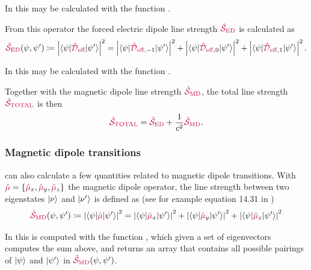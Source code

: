 \documentclass[11pt, twoside,openright]{article}
\begin{document}
In \qlanth this may be calculated with the function .

From this operator the forced electric dipole line strength $\textcolor{purple}{\hat{\mathcal{S}}_\text{ED}}$ is calculated as
\begin{equation} \label{eqn:forced-ED-line-strength}
	\textcolor{purple}{\hat{\mathcal{S}}_\text{ED}}(\psi,\psi') \coloneqq \left| \langle \psi|\textcolor{purple}{{\textcolor{purple}{\hat{\mathcal{D}}}_\text{eff}}}|\psi'\rangle \right|^2 = \left| \langle \psi|\textcolor{purple}{{\textcolor{purple}{\hat{\mathcal{D}}}_\text{eff}}}_{,-1}|\psi'\rangle \right|^2 + \left| \langle \psi|\textcolor{purple}{{\textcolor{purple}{\hat{\mathcal{D}}}_\text{eff}}}_{,0}|\psi'\rangle \right|^2 + \left| \langle \psi|\textcolor{purple}{{\textcolor{purple}{\hat{\mathcal{D}}}_\text{eff}}}_{,1}|\psi'\rangle \right|^2.
\end{equation}

In \qlanth this may be calculated with the function .

Together with the magnetic dipole line strength $\textcolor{purple}{\hat{\mathcal{S}}_\text{MD}}$, the total line strength $\textcolor{purple}{\hat{\mathcal{S}}_\text{TOTAL}}$ is then 
\begin{equation} \label{eqn:total-line-strength}
	\textcolor{purple}{\hat{\mathcal{S}}_\text{TOTAL}} = \textcolor{purple}{\hat{\mathcal{S}}_\text{ED}} + \frac{1}{c^2} \textcolor{purple}{\hat{\mathcal{S}}_\text{MD}}.
\end{equation}

 

 

\subsubsection{Magnetic dipole transitions}

\qlanth can also calculate a few quantities related to magnetic dipole transitions. With $\textcolor{purple}{\hat{\mu}} = \{\textcolor{purple}{\hat{\mu}}_x, \textcolor{purple}{\hat{\mu}}_y, \textcolor{purple}{\hat{\mu}}_z\}$ the magnetic dipole operator, the line strength between two eigenstates $|\nu\rangle$ and $|\nu'\rangle$ is defined as (see for example equation 14.31 in \cite{cowan_theory_1981})
\begin{equation}
	\textcolor{purple}{\hat{\mathcal{S}}_\text{MD}}(\psi,\psi') \coloneqq \left| \langle \psi|\textcolor{purple}{\hat{\mu}}|\psi'\rangle \right|^2 = \left| \langle \psi|\textcolor{purple}{\hat{\mu}}_x|\psi'\rangle \right|^2 + \left| \langle \psi|\textcolor{purple}{\hat{\mu}}_y|\psi'\rangle \right|^2 + \left| \langle \psi|\textcolor{purple}{\hat{\mu}}_z|\psi'\rangle \right|^2
\end{equation}

In \qlanth this is computed with the function , which given a set of eigenvectors computes the sum above, and returns an array that contains all possible pairings of $|\psi\rangle$ and $|\psi'\rangle$ in $\textcolor{purple}{\hat{\mathcal{S}}_\text{MD}}(\psi,\psi')$.
 
\end{document}
